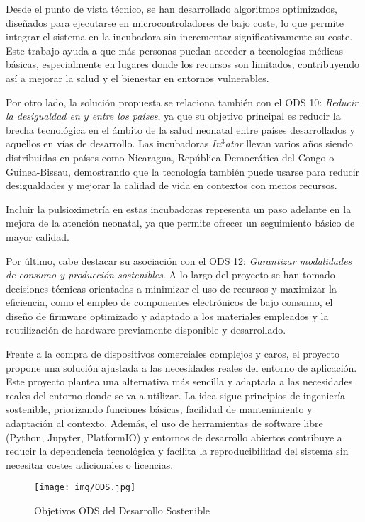 Desde el punto de vista técnico, se han desarrollado algoritmos optimizados, diseñados para ejecutarse en microcontroladores de bajo coste, lo que permite integrar el sistema en la incubadora sin incrementar significativamente su coste. Este trabajo ayuda a que más personas puedan acceder a tecnologías médicas básicas, especialmente en lugares donde los recursos son limitados, contribuyendo así a mejorar la salud y el bienestar en entornos vulnerables.

Por otro lado, la solución propuesta se relaciona también con el ODS 10: \textit{Reducir la desigualdad en y entre los países}, ya que su objetivo principal es reducir la brecha tecnológica en el ámbito de la salud neonatal entre países desarrollados y aquellos en vías de desarrollo. Las incubadoras \textit{In$^3$ator} llevan varios años siendo distribuidas en países como Nicaragua, República Democrática del Congo o Guinea-Bissau, demostrando que la tecnología también puede usarse para reducir desigualdades y mejorar la calidad de vida en contextos con menos recursos.

Incluir la pulsioximetría en estas incubadoras representa un paso adelante en la mejora de la atención neonatal, ya que permite ofrecer un seguimiento básico de mayor calidad.

Por último, cabe destacar su asociación con el ODS 12: \textit{Garantizar modalidades de consumo y producción sostenibles}. A lo largo del proyecto se han tomado decisiones técnicas orientadas a minimizar el uso de recursos y maximizar la eficiencia, como el empleo de componentes electrónicos de bajo consumo, el diseño de firmware optimizado y adaptado a los materiales empleados y la reutilización de hardware previamente disponible y desarrollado.

Frente a la compra de dispositivos comerciales complejos y caros, el proyecto propone una solución ajustada a las necesidades reales del entorno de aplicación. Este proyecto plantea una alternativa más sencilla y adaptada a las necesidades reales del entorno donde se va a utilizar. La idea sigue principios de ingeniería sostenible, priorizando funciones básicas, facilidad de mantenimiento y adaptación al contexto. Además, el uso de herramientas de software libre (Python, Jupyter, PlatformIO) y entornos de desarrollo abiertos contribuye a reducir la dependencia tecnológica y facilita la reproducibilidad del sistema sin necesitar costes adicionales o licencias.

\begin{figure}[H]
    \centering
    \texttt{[image: img/ODS.jpg]}
    \caption{Objetivos ODS del Desarrollo Sostenible}
    \label{fig:ODS}
\end{figure}

